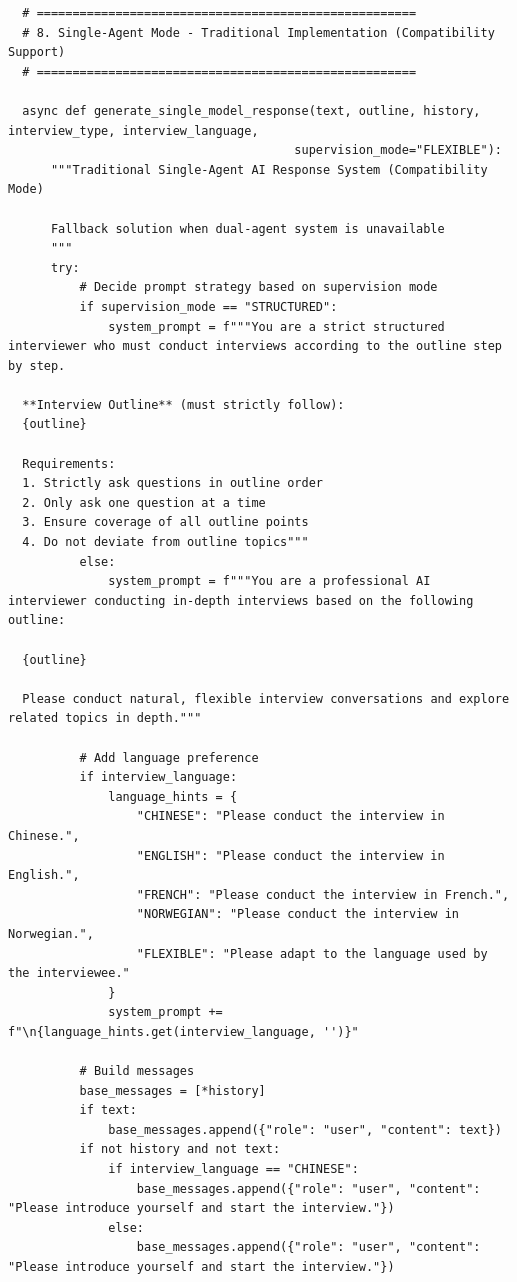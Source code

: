 \documentclass[sigchi,nonacm,manuscript]{acmart}
\begin{document}
\begin{lstlisting}
  # =====================================================
  # 8. Single-Agent Mode - Traditional Implementation (Compatibility Support)
  # =====================================================

  async def generate_single_model_response(text, outline, history, interview_type, interview_language, 
                                        supervision_mode="FLEXIBLE"):
      """Traditional Single-Agent AI Response System (Compatibility Mode)
      
      Fallback solution when dual-agent system is unavailable
      """
      try:
          # Decide prompt strategy based on supervision mode
          if supervision_mode == "STRUCTURED":
              system_prompt = f"""You are a strict structured interviewer who must conduct interviews according to the outline step by step.

  **Interview Outline** (must strictly follow):
  {outline}

  Requirements:
  1. Strictly ask questions in outline order
  2. Only ask one question at a time
  3. Ensure coverage of all outline points
  4. Do not deviate from outline topics"""
          else:
              system_prompt = f"""You are a professional AI interviewer conducting in-depth interviews based on the following outline:

  {outline}

  Please conduct natural, flexible interview conversations and explore related topics in depth."""
          
          # Add language preference
          if interview_language:
              language_hints = {
                  "CHINESE": "Please conduct the interview in Chinese.",
                  "ENGLISH": "Please conduct the interview in English.",
                  "FRENCH": "Please conduct the interview in French.",
                  "NORWEGIAN": "Please conduct the interview in Norwegian.",
                  "FLEXIBLE": "Please adapt to the language used by the interviewee."
              }
              system_prompt += f"\n{language_hints.get(interview_language, '')}"
          
          # Build messages
          base_messages = [*history]
          if text:
              base_messages.append({"role": "user", "content": text})
          if not history and not text:
              if interview_language == "CHINESE":
                  base_messages.append({"role": "user", "content": "Please introduce yourself and start the interview."})
              else:
                  base_messages.append({"role": "user", "content": "Please introduce yourself and start the interview."})
          

\end{lstlisting}
\end{document}
